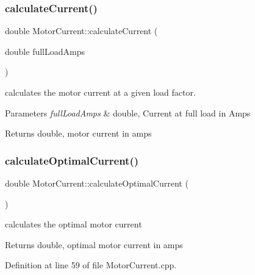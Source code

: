 \subsubsection{\texorpdfstring{calculate\+Current()}{calculateCurrent()}\hspace{0.1cm}{\footnotesize\ttfamily [3/3]}}
{\footnotesize\ttfamily double Motor\+Current\+::calculate\+Current (\begin{DoxyParamCaption}\item[{double}]{full\+Load\+Amps }\end{DoxyParamCaption})}

calculates the motor current at a given load factor. 
\begin{DoxyParams}{Parameters}
{\em full\+Load\+Amps} & double, Current at full load in Amps \\
\hline
\end{DoxyParams}
\begin{DoxyReturn}{Returns}
double, motor current in amps 
\end{DoxyReturn}
\mbox{\label{class_motor_current_a40638a00e4d21b34c74f8406f4e70046}} 
\subsubsection{\texorpdfstring{calculate\+Optimal\+Current()}{calculateOptimalCurrent()}\hspace{0.1cm}{\footnotesize\ttfamily [1/3]}}
{\footnotesize\ttfamily double Motor\+Current\+::calculate\+Optimal\+Current (\begin{DoxyParamCaption}{ }\end{DoxyParamCaption})}

calculates the optimal motor current \begin{DoxyReturn}{Returns}
double, optimal motor current in amps 
\end{DoxyReturn}


Definition at line 59 of file Motor\+Current.\+cpp.

\mbox{\label{class_motor_current_a40638a00e4d21b34c74f8406f4e70046}} 
